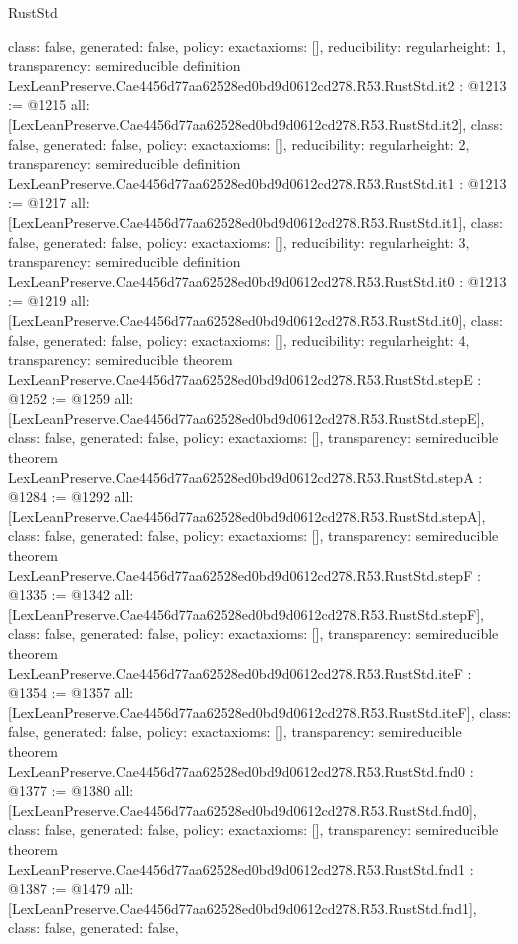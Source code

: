 \begin{lexlean}{RustStd}
\begin{coremodule}
{  class: false,
  generated: false,
  policy: exact{axioms: []},
  reducibility: regular{height: 1},
  transparency: semireducible
}
definition LexLeanPreserve.Cae4456d77aa62528ed0bd9d0612cd278.R53.RustStd.it2 : @1213 := @1215 {
  all: [LexLeanPreserve.Cae4456d77aa62528ed0bd9d0612cd278.R53.RustStd.it2],
  class: false,
  generated: false,
  policy: exact{axioms: []},
  reducibility: regular{height: 2},
  transparency: semireducible
}
definition LexLeanPreserve.Cae4456d77aa62528ed0bd9d0612cd278.R53.RustStd.it1 : @1213 := @1217 {
  all: [LexLeanPreserve.Cae4456d77aa62528ed0bd9d0612cd278.R53.RustStd.it1],
  class: false,
  generated: false,
  policy: exact{axioms: []},
  reducibility: regular{height: 3},
  transparency: semireducible
}
definition LexLeanPreserve.Cae4456d77aa62528ed0bd9d0612cd278.R53.RustStd.it0 : @1213 := @1219 {
  all: [LexLeanPreserve.Cae4456d77aa62528ed0bd9d0612cd278.R53.RustStd.it0],
  class: false,
  generated: false,
  policy: exact{axioms: []},
  reducibility: regular{height: 4},
  transparency: semireducible
}
theorem LexLeanPreserve.Cae4456d77aa62528ed0bd9d0612cd278.R53.RustStd.stepE : @1252 := @1259 {
  all: [LexLeanPreserve.Cae4456d77aa62528ed0bd9d0612cd278.R53.RustStd.stepE],
  class: false,
  generated: false,
  policy: exact{axioms: []},
  transparency: semireducible
}
theorem LexLeanPreserve.Cae4456d77aa62528ed0bd9d0612cd278.R53.RustStd.stepA : @1284 := @1292 {
  all: [LexLeanPreserve.Cae4456d77aa62528ed0bd9d0612cd278.R53.RustStd.stepA],
  class: false,
  generated: false,
  policy: exact{axioms: []},
  transparency: semireducible
}
theorem LexLeanPreserve.Cae4456d77aa62528ed0bd9d0612cd278.R53.RustStd.stepF : @1335 := @1342 {
  all: [LexLeanPreserve.Cae4456d77aa62528ed0bd9d0612cd278.R53.RustStd.stepF],
  class: false,
  generated: false,
  policy: exact{axioms: []},
  transparency: semireducible
}
theorem LexLeanPreserve.Cae4456d77aa62528ed0bd9d0612cd278.R53.RustStd.iteF : @1354 := @1357 {
  all: [LexLeanPreserve.Cae4456d77aa62528ed0bd9d0612cd278.R53.RustStd.iteF],
  class: false,
  generated: false,
  policy: exact{axioms: []},
  transparency: semireducible
}
theorem LexLeanPreserve.Cae4456d77aa62528ed0bd9d0612cd278.R53.RustStd.fnd0 : @1377 := @1380 {
  all: [LexLeanPreserve.Cae4456d77aa62528ed0bd9d0612cd278.R53.RustStd.fnd0],
  class: false,
  generated: false,
  policy: exact{axioms: []},
  transparency: semireducible
}
theorem LexLeanPreserve.Cae4456d77aa62528ed0bd9d0612cd278.R53.RustStd.fnd1 : @1387 := @1479 {
  all: [LexLeanPreserve.Cae4456d77aa62528ed0bd9d0612cd278.R53.RustStd.fnd1],
  class: false,
  generated: false,
}
\end{coremodule}
\end{lexlean}
